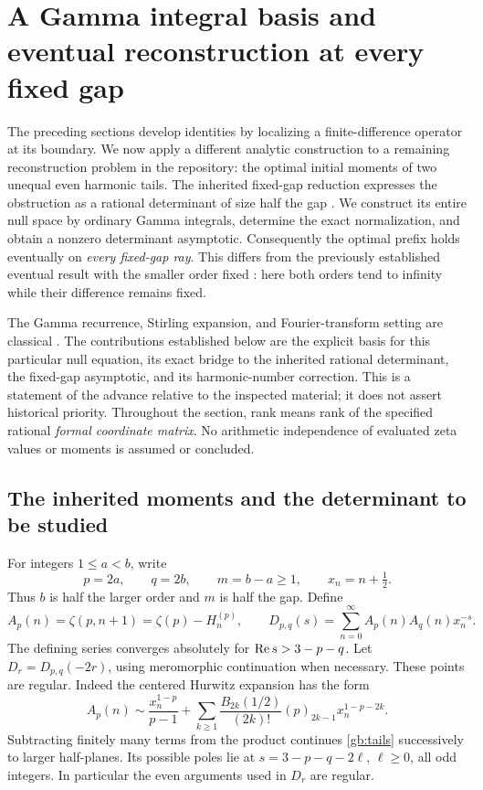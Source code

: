 \section{A Gamma integral basis and eventual reconstruction at every fixed gap}
\label{gb:section}

The preceding sections develop identities by localizing a finite-difference
operator at its boundary.  We now apply a different analytic construction
to a remaining reconstruction problem in the repository: the optimal
initial moments of two unequal even harmonic tails.  The inherited
fixed-gap reduction expresses the obstruction as a rational determinant
of size half the gap \cite{repo-gamma}.  We construct its entire null
space by ordinary Gamma integrals, determine the exact normalization,
and obtain a nonzero determinant asymptotic.  Consequently the optimal
prefix holds eventually on \emph{every fixed-gap ray}.  This differs from
the previously established eventual result with the smaller order fixed
\cite{repo:quartic}:
here both orders tend to infinity while their difference remains fixed.

The Gamma recurrence, Stirling expansion, and Fourier-transform setting
are classical \cite{dlmf:gamma,dlmf-stirling,ramanujan-transform}.
The contributions established below are the explicit basis for this
particular null equation, its exact bridge to the inherited rational
determinant, the fixed-gap asymptotic, and its harmonic-number correction.
This is a statement of the advance relative to the inspected material;
it does not assert historical priority.  Throughout the section, rank
means rank of the specified rational \emph{formal coordinate matrix}.
No arithmetic independence of evaluated zeta values or moments is
assumed or concluded.

\subsection{The inherited moments and the determinant to be studied}

For integers $1\le a<b$, write
\[
 p=2a,\qquad q=2b,\qquad m=b-a\ge1,
 \qquad x_n=n+\tfrac12.
\]
Thus $b$ is half the larger order and $m$ is half the gap.  Define
\begin{equation}\label{gb:tails}
 A_p(n)=\zeta(p,n+1)=\zeta(p)-H_n^{(p)},\qquad
 D_{p,q}(s)=\sum_{n=0}^{\infty}A_p(n)A_q(n)x_n^{-s}.
\end{equation}
The defining series converges absolutely for $\operatorname{Re} s>3-p-q$.
Let $D_r=D_{p,q}(-2r)$, using meromorphic continuation when necessary.
These points are regular.  Indeed the centered Hurwitz expansion has
the form
\[
 A_p(n)\sim\frac{x_n^{1-p}}{p-1}
 +\sum_{k\ge1}\frac{B_{2k}(1/2)}{(2k)!}
       (p)_{2k-1}x_n^{1-p-2k}.
\]
Subtracting finitely many terms from the product continues
\eqref{gb:tails} successively to larger half-planes.  Its possible poles
lie at $s=3-p-q-2\ell$, $\ell\ge0$, all odd integers.  In particular
the even arguments used in $D_r$ are regular.

